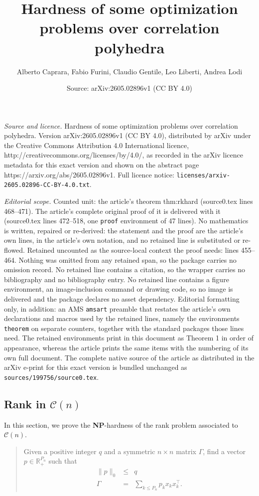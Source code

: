 \documentclass[10pt,a4paper]{amsart}
\title{Hardness of some optimization problems over correlation polyhedra}
\author{Alberto Caprara, Fabio Furini, Claudio Gentile, Leo Liberti, Andrea Lodi}
\date{Source: arXiv:2605.02896v1 (CC BY 4.0)}
\newcommand{\CONX}[1]{\mathcal{C}(#1)}
\newcommand{\transpose}[1]{{#1}^{\top}}
\begin{document}
\maketitle

\noindent\emph{Source and licence.} Hardness of some optimization problems over correlation polyhedra. Version arXiv:2605.02896v1 (CC BY 4.0), distributed by arXiv under the Creative Commons Attribution 4.0 International licence, http://creativecommons.org/licenses/by/4.0/, as recorded in the arXiv licence metadata for this exact version and shown on the abstract page https://arxiv.org/abs/2605.02896v1. Full licence notice: \texttt{licenses/arxiv-2605.02896-CC-BY-4.0.txt}.\par\smallskip

\noindent\textit{Editorial scope.} Counted unit: the article's theorem thm:rkhard (source0.tex lines 468--471). The article's complete original proof of it is delivered with it (source0.tex lines 472--518, one \texttt{proof} environment of 47 lines). No mathematics is written, repaired or re-derived: the statement and the proof are the article's own lines, in the article's own notation, and no retained line is substituted or re-flowed.  Retained uncounted as the source-local context the proof needs: lines 455--464.  Nothing was omitted from any retained span, so the package carries no omission record.  No retained line contains a citation, so the wrapper carries no bibliography and no bibliography entry.  No retained line contains a figure environment, an image-inclusion command or drawing code, so no image is delivered and the package declares no asset dependency.  Editorial formatting only, in addition: an AMS \texttt{amsart} preamble that restates the article's own declarations and macros used by the retained lines, namely the environments \texttt{theorem} on separate counters, together with the standard packages those lines need.  The retained environments print in this document as Theorem 1 in order of appearance, whereas the article prints the same items with the numbering of its own full document.  The complete native source of the article as distributed in the arXiv e-print for this exact version is bundled unchanged as \texttt{sources/199756/source0.tex}.
\subsection{Rank in $\CONX{n}$}
\label{s:rank}
In this section, we prove the \textbf{NP}-hardness of the rank problem associated to $\CONX{n}$.
\begin{quote}
  Given a positive integer $q$ and a symmetric $n\times n$ matrix $\Gamma$, find a vector $p\in\mathbb{R}^{P_n}_+$ such that
  \begin{eqnarray}
    \|p\|_0 &\le& q \label{eq:rk1} \\
    \Gamma &=& \sum_{k\le P_n} p_k x_k\transpose{x}_k. \label{eq:rk2}
\end{eqnarray}
\end{quote}
\end{document}
